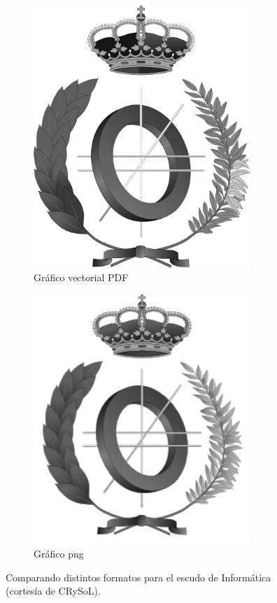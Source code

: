 \documentclass[11pt,a4paper]{article}
\begin{document}
\begin{figure}[hbt]
	\centering
	\begin{subfigure}[b]{0.4\textwidth}
		\centering
		\includegraphics[width=0.9\textwidth]{escudoInfBW.pdf}
		\caption{Gráfico vectorial \textsf{PDF}}\label{fig:escudoPDF}
	\end{subfigure}
	\begin{subfigure}[b]{0.4\textwidth}
		\centering
		\includegraphics[width=0.9\textwidth]{escudoInfBW.png}
		\caption{Gráfico png}\label{fig:escudoPNG}
	\end{subfigure}
	\caption[Comparación \textsf{PDF} y png]{Comparando distintos formatos para el escudo de Informática (cortesía de CRySoL).}
	\label{fig:escudo}
\end{figure}
\end{document}

